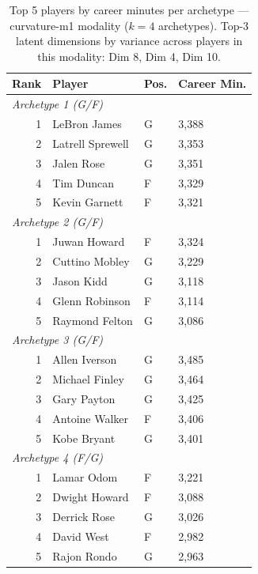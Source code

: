 \begin{table}[htbp]
  \centering\small
  \begin{tabular}{rlll}
    \toprule
    Rank & Player & Pos. & Career Min. \\
    \midrule
    \multicolumn{4}{l}{\textit{Archetype 1 (G/F)}} \\
    \midrule
    1 & LeBron James & G & 3,388 \\
    2 & Latrell Sprewell & G & 3,353 \\
    3 & Jalen Rose & G & 3,351 \\
    4 & Tim Duncan & F & 3,329 \\
    5 & Kevin Garnett & F & 3,321 \\
    \midrule[0.4pt]
    \multicolumn{4}{l}{\textit{Archetype 2 (G/F)}} \\
    \midrule
    1 & Juwan Howard & F & 3,324 \\
    2 & Cuttino Mobley & G & 3,229 \\
    3 & Jason Kidd & G & 3,118 \\
    4 & Glenn Robinson & F & 3,114 \\
    5 & Raymond Felton & G & 3,086 \\
    \midrule[0.4pt]
    \multicolumn{4}{l}{\textit{Archetype 3 (G/F)}} \\
    \midrule
    1 & Allen Iverson & G & 3,485 \\
    2 & Michael Finley & G & 3,464 \\
    3 & Gary Payton & G & 3,425 \\
    4 & Antoine Walker & F & 3,406 \\
    5 & Kobe Bryant & G & 3,401 \\
    \midrule[0.4pt]
    \multicolumn{4}{l}{\textit{Archetype 4 (F/G)}} \\
    \midrule
    1 & Lamar Odom & F & 3,221 \\
    2 & Dwight Howard & F & 3,088 \\
    3 & Derrick Rose & G & 3,026 \\
    4 & David West & F & 2,982 \\
    5 & Rajon Rondo & G & 2,963 \\
    \bottomrule
  \end{tabular}
  \caption{Top 5 players by career minutes per archetype --- curvature-m1 modality ($k=4$ archetypes). Top-3 latent dimensions by variance across players in this modality: Dim 8, Dim 4, Dim 10.}
  \label{tab:arch_reps_curvature_m1}
\end{table}

